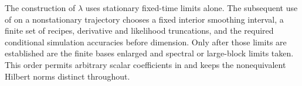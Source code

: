 \begin{remark}
The construction of $\lambda$ uses stationary fixed-time limits alone.\label{rem:exact-parameter-order}
The subsequent use of  on a nonstationary
trajectory chooses a fixed interior smoothing interval, a finite set of
recipes, derivative and likelihood truncations, and the required
conditional simulation accuracies before dimension.  Only after those
limits are established are the finite bases enlarged and spectral or
large-block limits taken.  This order permits arbitrary scalar
coefficients in  and keeps the nonequivalent
Hilbert norms distinct throughout.
\end{remark}
